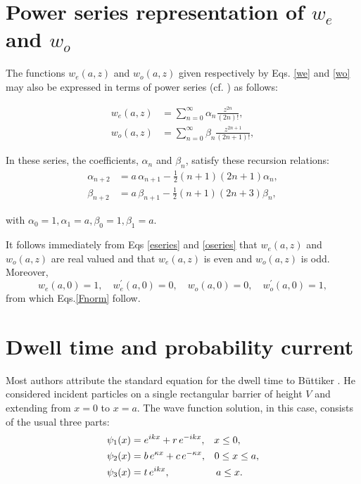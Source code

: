 \documentclass{article}
\numberwithin{equation}{section}
\begin{document}
{\section{Power series representation of $w_e$ and $w_o$}\label{psw}

The functions $w_e(a,z)$ and $w_o(a,z)$ given respectively by Eqs. \eqref{we} and \eqref{wo} may also be expressed in terms of power series (cf. \cite{OLBC10}) as follows: 

\begin{align}
w_e(a,z)&=\sum^{\infty}_{n=0}\alpha_n \frac{z^{2n}}{(2n)!},\label{eseries}\\
w_o(a,z)&=\sum^{\infty}_{n=0}\beta_n \frac{z^{2n+1}}{(2n+1)!}\label{oseries},
\end{align}

In these series, the coefficients, $\alpha_n$ and  $\beta_n$, satisfy these recursion relations:
\begin{align}
\alpha_{n+2}&= a\,\alpha_{n+1}-\tfrac{1}{2}(n+1)(2n+1)\alpha_n,\label{rec1}\\
\beta_{n+2}&= a\,\beta_{n+1}-\tfrac{1}{2}(n+1)(2n+3)\beta_n,\label{rec2}
\end{align}

with $\alpha_0 = 1, \alpha_1 = a, \beta_0 = 1, \beta_1 = a$.

It follows immediately from Eqs \eqref{eseries} and \eqref{oseries} that $w_e(a,z)$ and $w_o(a,z)$ are real valued and that $w_e(a,z)$ is even and $w_o(a,z)$ is odd.  Moreover,
\begin{equation}\label{windep}
w_e(a, 0)=1, \quad w_e^\prime(a,0)=0, \quad w_o(a,0)=0, \quad w_o^\prime(a,0)=1,
\end{equation}
from which Eqs.\eqref{Fnorm} follow.

\section{Dwell time and probability current}\label{jdt}

Most authors attribute the standard equation for the dwell time to B\"{u}ttiker \cite{Bu83}.  He considered incident particles on a single rectangular barrier of height $V$ and extending from $x=0$ to $x=a$. The wave function solution, in this case, consists of the usual three parts:
\begin{align}
\psi_1(x)&=e^{ikx}+r\,e^{-ikx},\;\;\;x\leq 0,\label{cpsi1}\\
\psi_2(x)&=b\,e^{\kappa x}+c\,e^{-\kappa x},\;\;\;0\leq x\leq a,\label{cpsi2}\\
\psi_3(x)&=t\,e^{ikx},\hspace{1.65cm}a\leq x.\label{cpsi3}
\end{align}

}
\end{document}
